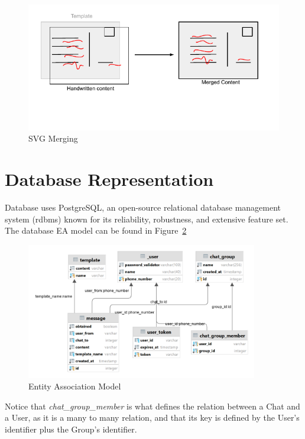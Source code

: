 \begin{figure}[!ht]
	\centering
	\includegraphics[trim={ 0cm 1,5cm 0cm 0cm },width=1\textwidth]{./Chapter4/Figures/Svg Merging}
	\caption{SVG Merging}
	\label{fig:SVGMerge}
\end{figure}


\newpage

\section{Database Representation}
Database uses PostgreSQL, an open-source relational database management system (\gls{rdbms}) known for its reliability, robustness, and extensive feature set.
The database EA model can be found in Figure~\ref{fig:EA}


\begin{figure}[!ht]
	\centering
	\includegraphics[trim={ 0cm 0cm 0cm 0cm },width=0.9\textwidth]{./Chapter4/Figures/EA}
	\caption{Entity Association Model}
	\label{fig:EA}
\end{figure}

Notice that \textit{ chat\_group\_member } is what defines the relation between a Chat and a User, as it is a many to many relation, and that its key is defined by the User's identifier plus the Group's identifier.

